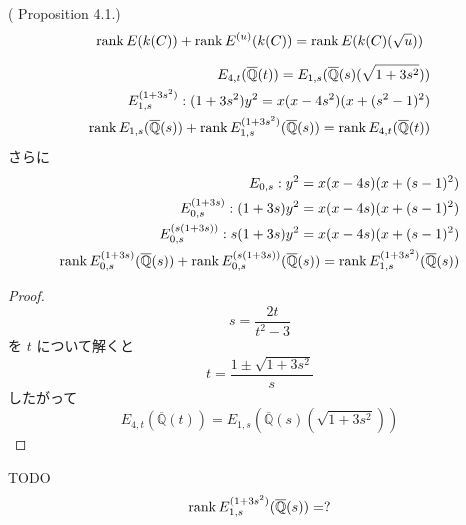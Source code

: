 \documentclass[main]{subfiles}
\begin{document}
\begin{thm}{(\cite{ref:naskrecki2013} Proposition 4.1.)}
    \begin{equation}
        \operatorname{rank} E(k(C)) + \operatorname{rank} E^{(u)}(k(C)) = \operatorname{rank} E(k(C)(\sqrt{u}))
    \end{equation}
\end{thm}

\begin{thm}
    \begin{align}
        E_{4,t}(\overline{\mathbb{Q}}(t)) = E_{1,s}(\overline{\mathbb{Q}}(s)(\sqrt{1 + 3s^{2}})) \\
        E_{1,s}^{(1 + 3s^{2})}: (1 + 3s^{2}) y^{2} = x(x - 4s^{2})(x + (s^{2} - 1)^{2})          \\
        \operatorname{rank} E_{1,s}(\overline{\mathbb{Q}}(s)) + \operatorname{rank} E_{1,s}^{(1 + 3s^{2})}(\overline{\mathbb{Q}}(s)) = \operatorname{rank} E_{4,t}(\overline{\mathbb{Q}}(t))
    \end{align}
    さらに
    \begin{align}
        E_{0,s}: y^{2} = x(x - 4s)(x + (s - 1)^{2})                         \\
        E_{0,s}^{(1 + 3s)}: (1 + 3s) y^{2} = x(x - 4s)(x + (s - 1)^{2})     \\
        E_{0,s}^{(s(1 + 3s))}: s(1 + 3s) y^{2} = x(x - 4s)(x + (s - 1)^{2}) \\
        \operatorname{rank} E_{0,s}^{(1 + 3s)}(\overline{\mathbb{Q}}(s)) + \operatorname{rank} E_{0,s}^{(s(1 + 3s))}(\overline{\mathbb{Q}}(s)) = \operatorname{rank} E_{1,s}^{(1 + 3s^{2})}(\overline{\mathbb{Q}}(s))
    \end{align}
\end{thm}
\begin{proof}
    \begin{equation}
        s = \frac{2t}{t^{2} - 3}
    \end{equation}
    を $t$ について解くと
    \begin{equation}
        t = \frac{1 \pm \sqrt{1 + 3s^{2}}}{s}
    \end{equation}
    したがって
    \begin{equation}
        E_{4,t}(\overline{\mathbb{Q}}(t)) = E_{1,s}(\overline{\mathbb{Q}}(s)(\sqrt{1 + 3s^{2}}))
    \end{equation}
\end{proof}

\begin{thm}
    TODO
    \begin{equation}
        \operatorname{rank} E_{1,s}^{(1 + 3s^{2})}(\overline{\mathbb{Q}}(s)) = ?
    \end{equation}
\end{thm}
\end{document}
